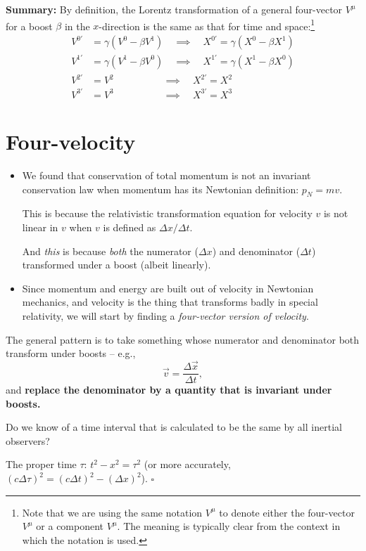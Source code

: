 \documentclass[11pt, letterpaper, openany]{book}
\newenvironment{exercise}[1][Exercise]{%
  \tcolorbox[blanker, breakable, left=1em,
    before skip=1em, after skip=1em,
    borderline west={3pt}{0pt}{PhysNavy},
    colback=PhysCream,
    before upper={\textcolor{PhysNavy}{\sffamily\bfseries #1:}\space}
  ]%
}{%
  \endtcolorbox%
}
\newenvironment{solution}[1][Solution]{%
  \tcolorbox[blanker, breakable, left=1em,
    before skip=1em, after skip=1em,
    borderline west={2pt}{0pt}{PhysTeal},
    colback=PhysCream,
    before upper={\textcolor{PhysTeal}{\sffamily\bfseries #1.}\space}
  ]%
}{%
  \hfill\textcolor{PhysTeal}{\ensuremath{\square}}\endtcolorbox%
}
\begin{document}
\textbf{Summary:} By definition, the Lorentz transformation of a general four-vector $V^\mu$ for a boost $\beta$ in the $x$-direction is the same as that for time and space:\footnote{Note that we are using the same notation $V^\mu$ to denote either the four-vector $V^\mu$ or a component $V^\mu$. The meaning is typically clear from the context in which the notation is used.}
\begin{align*}
    V^{0'} &= \gamma(V^0 - \beta V^1) \quad\implies\quad X^{0'} = \gamma(X^0 - \beta X^1) \\
    V^{1'} &= \gamma(V^1 - \beta V^0) \quad\implies\quad X^{1'} = \gamma(X^1 - \beta X^0) \\
    V^{2'} &= V^2 \qquad\qquad\quad\implies\quad X^{2'} = X^2 \\
    V^{3'} &= V^3 \qquad\qquad\quad\implies\quad X^{3'} = X^3
\end{align*}

\section{Four-velocity}

\begin{itemize}
    \item We found that conservation of total momentum is not an invariant conservation law when momentum has its Newtonian definition: $p_N = mv$.
    
    This is because the relativistic transformation equation for velocity $v$ is not linear in $v$ when $v$ is defined as $\Delta x / \Delta t$.
    
    And \textit{this} is because \textit{both} the numerator ($\Delta x$) and denominator ($\Delta t$) transformed under a boost (albeit linearly).
    \item Since momentum and energy are built out of velocity in Newtonian mechanics, and velocity is the thing that transforms badly in special relativity, we will start by finding a \textit{four-vector version of velocity}.
\end{itemize}

The general pattern is to take something whose numerator and denominator both transform under boosts -- e.g.,
\[ \vec{v} = \frac{\Delta \vec{x}}{\Delta t}, \]
and \textbf{replace the denominator by a quantity that is invariant under boosts.}

\begin{exercise}[Quick Exercise 4]
Do we know of a time interval that is calculated to be the same by all inertial observers?
\end{exercise}
\begin{solution}
The proper time $\tau$: $t^2 - x^2 = \tau^2$ (or more accurately, $(c\Delta \tau)^2 = (c\Delta t)^2 - (\Delta x)^2$).
\end{solution}
\end{document}
